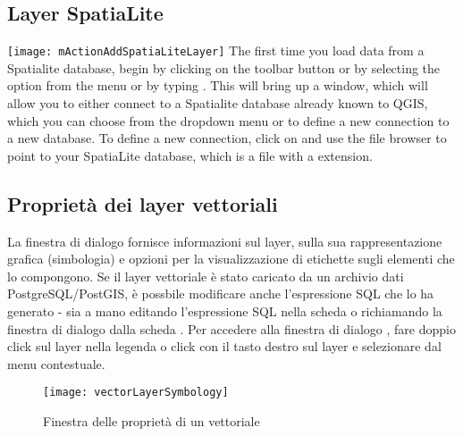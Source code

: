 \subsection{Layer SpatiaLite} 
\label{label_spatialite} 

\texttt{[image: mActionAddSpatiaLiteLayer]}
The first time you load data from a Spatialite database, begin by clicking on the 
 toolbar button or by selecting the 
option from the  menu or by typing . 
This will bring up a window, which will allow you to either connect to a Spatialite database already known to QGIS, which 
you can choose from the dropdown menu or to define a new connection to a new database. To define a new connection, 
click on  and use the file browser to point to your SpatiaLite database, 
which is a file with a  extension.

\subsection{Proprietà dei layer vettoriali}\label{sec:vectorprops}

La finestra di dialogo  fornisce informazioni
sul layer, sulla sua rappresentazione grafica (simbologia) e opzioni per la
visualizzazione di etichette sugli elementi che lo compongono. Se il layer
vettoriale è stato caricato da un archivio dati PostgreSQL/PostGIS, è possbile
modificare anche l'espressione SQL che lo ha generato - sia a mano editando
l'espressione SQL nella scheda  o richiamando la finestra di
dialogo  dalla scheda . 
Per accedere alla finestra di dialogo , fare
doppio click sul layer nella legenda o click con il tasto destro  sul layer e
selezionare  dal menu contestuale.

\begin{figure}[H]
   \begin{center}
   \caption{Finestra delle proprietà di un vettoriale \nixcaption}\label{fig:vector_symbology}\smallskip
   \texttt{[image: vectorLayerSymbology]} 
\end{center}  
\end{figure}

